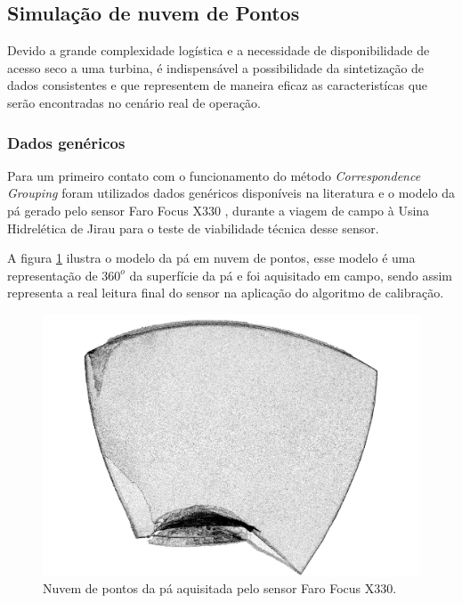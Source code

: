 \subsection{Simulação de nuvem de Pontos}

Devido a grande complexidade logística e a necessidade de disponibilidade de
acesso seco a uma turbina, é indispensável a possibilidade da sintetização de
dados consistentes e que representem de maneira eficaz as caracteristícas que
serão encontradas no cenário real de operação. 

\subsubsection{Dados genéricos}

Para um primeiro contato com o funcionamento do método \textit{Correspondence
Grouping} foram utilizados dados genéricos disponíveis na
literatura\footnotemark {} e o modelo da pá gerado pelo sensor Faro Focus X330 , durante a viagem de campo
à Usina Hidrelética de Jirau para o teste de viabilidade técnica desse sensor.


A figura \ref{fig::modelo_pa_faro} ilustra o modelo da pá em nuvem de pontos,
esse modelo é uma representação de $360^o$ da superfície da pá e foi aquisitado em
campo, sendo assim representa a real leitura final do sensor na aplicação do
algoritmo de calibração.

\begin{figure}[h!]
	\centering
	\includegraphics[width=0.9\columnwidth]{figs/calibracao/modelo_pa_faro}
	\caption{Nuvem de pontos da pá aquisitada pelo sensor Faro Focus X330.}
    \label{fig::modelo_pa_faro}
\end{figure}

